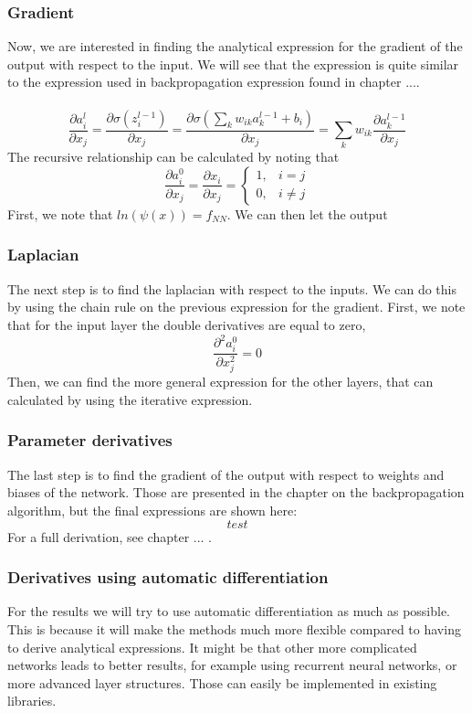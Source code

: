 \subsubsection{Gradient}
Now, we are interested in finding the analytical expression for the gradient of the output with respect to the input. We will see that the expression is quite similar to the expression used in backpropagation expression found in chapter ....  
\\
\\
\begin{equation}
    \frac{\partial a_i^l}{\partial x_j} = \frac{\partial \sigma(z_i^{l-1})}{\partial x_j} =  \frac{\partial \sigma\left(\sum_k w_{ik} a_k^{l-1} + b_i\right)}{\partial x_j} = \sum_k w_{ik}\frac{\partial a_k^{l-1} }{\partial x_j} 
\end{equation}
The recursive relationship can be calculated by noting that
\begin{equation}
    \frac{\partial a_i^0}{\partial x_j} = \frac{\partial x_i}{\partial x_j} = 
    \begin{cases}
    1, & i=j \\
    0, & i \neq j
    \end{cases}
\end{equation}
First, we note that $ln(\psi(x)) = f_{NN}$. We can then let the output
\subsubsection{Laplacian}
The next step is to find the laplacian with respect to the inputs. We can do this by using the chain rule on the previous expression for the gradient. First, we note that for the input layer the double derivatives are equal to zero,
\begin{equation}
    \frac{\partial^2 a_i^0}{\partial x_j^2} = 0
\end{equation}
Then, we can find the more general expression for the other layers, that can calculated by using the iterative expression.

\subsubsection{Parameter derivatives}
The last step is to find the gradient of the output with respect to weights and biases of the network. Those are presented in the chapter on the backpropagation algorithm, but the final expressions are shown here:
\begin{equation}
    test
\end{equation}
For a full derivation, see chapter ... .
\subsubsection{Derivatives using automatic differentiation}
For the results we will try to use automatic differentiation as much as possible. This is because it will make the methods much more flexible compared to having to derive analytical expressions. It might be that other more complicated networks leads to better results, for example using recurrent neural networks, or more advanced layer structures. Those can easily be implemented in existing libraries.
\newpage